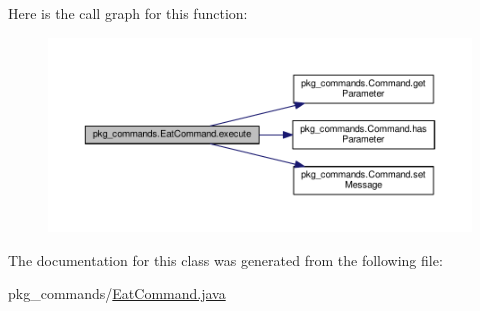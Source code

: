 Here is the call graph for this function\-:\nopagebreak
\begin{figure}[H]
\begin{center}
\leavevmode
\includegraphics[width=350pt]{classpkg__commands_1_1EatCommand_a2a600f09891aa076b3f630293de965f4_cgraph}
\end{center}
\end{figure}




The documentation for this class was generated from the following file\-:\begin{DoxyCompactItemize}
\item 
pkg\-\_\-commands/\hyperlink{EatCommand_8java}{Eat\-Command.\-java}\end{DoxyCompactItemize}

